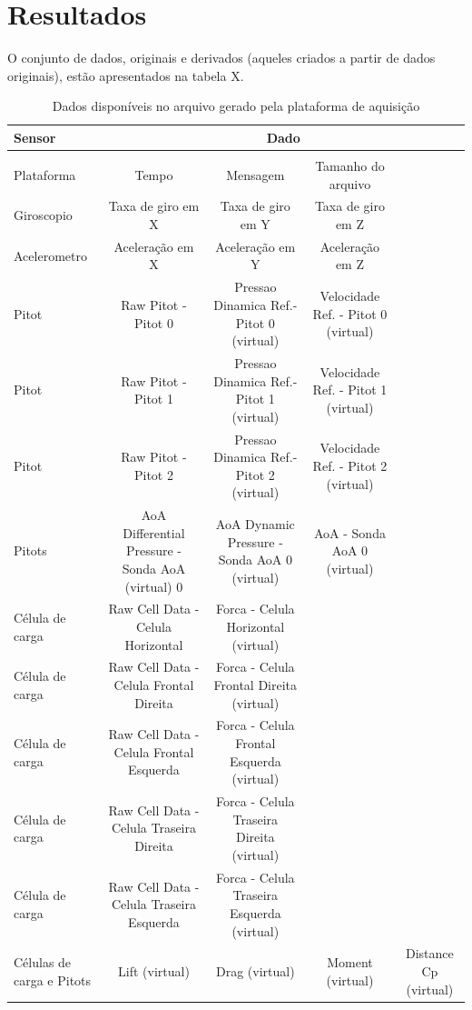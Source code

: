 \chapter{Resultados}\label{chp:res}

O conjunto de dados, originais e derivados (aqueles criados a partir de dados originais), estão apresentados na tabela X.

\begin{table}[]
\centering
\begin{tabular}{|l|c|c|c|c|}
\hline
Sensor & \multicolumn{4}{c|}{Dado} \\ \hline
 & \multicolumn{4}{l|}{} \\ \hline
Plataforma & Tempo & Mensagem & Tamanho do arquivo \\ \hline
Giroscopio & Taxa de giro em X & Taxa de giro em Y & Taxa de giro em Z &  \\ \hline
Acelerometro & Aceleração em X & Aceleração em Y & Aceleração em Z &  \\ \hline
Pitot & Raw Pitot - Pitot 0 & Pressao Dinamica Ref.- Pitot 0 (virtual) & Velocidade Ref. - Pitot 0 (virtual) &  \\ \hline
Pitot & Raw Pitot - Pitot 1 & Pressao Dinamica Ref.- Pitot 1 (virtual) & Velocidade Ref. - Pitot 1 (virtual) &  \\ \hline
Pitot & Raw Pitot - Pitot 2 & Pressao Dinamica Ref.- Pitot 2 (virtual) & Velocidade Ref. - Pitot 2 (virtual) &  \\ \hline
Pitots & AoA Differential Pressure - Sonda AoA (virtual) 0 & AoA Dynamic Pressure - Sonda AoA 0 (virtual) & AoA - Sonda AoA 0 (virtual) &  \\ \hline
Célula de carga & Raw Cell Data - Celula Horizontal & Forca - Celula Horizontal (virtual) &  &  \\ \hline
Célula de carga & Raw Cell Data - Celula Frontal Direita & Forca - Celula Frontal Direita (virtual) &  &  \\ \hline
Célula de carga & Raw Cell Data - Celula Frontal Esquerda & Forca - Celula Frontal Esquerda (virtual) &  &  \\ \hline
Célula de carga & Raw Cell Data - Celula Traseira Direita & Forca - Celula Traseira Direita (virtual) &  &  \\ \hline
Célula de carga & Raw Cell Data - Celula Traseira Esquerda & Forca - Celula Traseira Esquerda (virtual) &  &  \\ \hline
Células de carga e Pitots & Lift (virtual) & Drag (virtual) & Moment (virtual) & Distance Cp (virtual) \\ \hline
\end{tabular}
\caption{Dados disponíveis no arquivo gerado pela plataforma de aquisição}
\label{tab:all_data_table}
\end{table}

